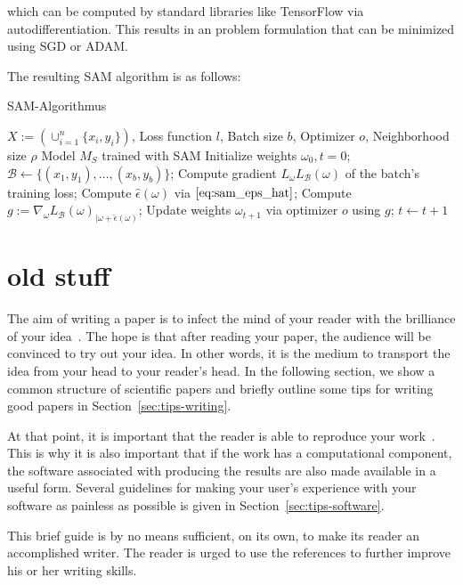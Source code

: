 \documentclass[10pt,conference,compsocconf]{IEEEtran}
\begin{document}
 which can be computed by standard libraries like TensorFlow via autodifferentiation. This results in an problem formulation that can be minimized using SGD or ADAM. 

The resulting SAM algorithm is as follows: 

\begin{algorithm}
\caption{SAM-Algorithmus}\label{alg:sam}
\begin{algorithmic}
\Require $X := (\cup_{i = 1}^n\{x_i, y_i\})$, Loss function $l$, Batch size $b$, Optimizer $o$, Neighborhood size $\rho$
\Ensure Model $M_S$ trained with SAM
\State Initialize weights $\omega_0, t = 0$;
	\State $\mathcal{B} \gets \{(x_1, y_1), ..., (x_b, y_b)\}$;	
	\State Compute gradient $L_\omega L_\mathcal{B}(\omega)$ of the batch's training loss; 
	\State Compute $\hat{\epsilon}(\omega)$ via $\eqref{eq:sam_eps_hat}$; 
	\State Compute $g := \nabla_\omega L_\mathcal{B}(\omega)_{|\omega + \hat{\epsilon}(\omega)}$; 
	\State Update weights $\omega_{t+1}$ via optimizer $o$ using $g$;
	\State $t \gets t+1$
\EndWhile
\end{algorithmic}
\end{algorithm}


\section{old stuff}

The aim of writing a paper is to infect the mind of your reader with the brilliance of your idea~\cite{jones08}. 
The hope is that after reading your
paper, the audience will be convinced to try out your idea. In other
words, it is the medium to transport the idea from your head to your
reader's head. 
In the following
section, we show a common structure of scientific papers and briefly
outline some tips for writing good papers in
Section~\ref{sec:tips-writing}.

At that
point, it is important that the reader is able to reproduce your
work~\cite{schwab00,wavelab,gentleman05}. This is why it is also
important that if the work has a computational component, the software
associated with producing the results are also made available in a
useful form. Several guidelines for making your user's experience with
your software as painless as possible is given in
Section~\ref{sec:tips-software}.

This brief guide is by no means sufficient, on its own, to
make its reader an accomplished writer. The reader is urged to use the
references to further improve his or her writing skills.
\end{document}
